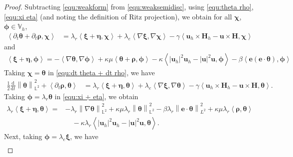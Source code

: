 \documentclass[11pt, reqno]{amsart}
\theoremstyle{definition}
\theoremstyle{remark}
\numberwithin{equation}{section}
\newcommand{\bff}{\boldsymbol}
\newcommand{\bb}{\mathbb}
\newcommand{\ddt}{\frac{\mathrm{d}}{\mathrm{d}t}}
\newcommand{\norm}[2]{\left\|{#1}\right\|_{#2}}
\newcommand{\inpro}[2]{\left\langle#1,#2\right\rangle}
\begin{document}
\begin{proof}
Subtracting \eqref{equ:weakform} from \eqref{equ:weaksemidisc}, using \eqref{equ:theta rho}, \eqref{equ:xi eta} (and noting the definition of Ritz projection), we obtain for all $\bff{\chi}$, $\bff{\phi}\in \bb{V}_h$,
\begin{align}\label{equ:dt theta + dt rho}
	\inpro{\partial_t \bff{\theta}+ \partial_t \bff{\rho}}{\bff{\chi}}
	&=
	\lambda_r \inpro{\bff{\xi}+\bff{\eta}}{\bff{\chi}}
	+
	\lambda_e \inpro{\nabla \bff{\xi}}{\nabla \bff{\chi}}
	-
	\gamma \inpro{\bff{u}_h \times \bff{H}_h - \bff{u} \times \bff{H}}{\bff{\chi}}
\end{align}
and
\begin{align}
	\label{equ:xi + eta}
	\inpro{\bff{\xi}+\bff{\eta}}{\bff{\phi}}
	=
	-\inpro{\nabla \bff{\theta}}{\nabla \bff{\phi}}
	+
	\kappa\mu \inpro{\bff{\theta}+\bff{\rho}}{\bff{\phi}}
	-
	\kappa \inpro{|\bff{u}_h|^2 \bff{u}_h - |\bff{u}|^2 \bff{u}}{\bff{\phi}}
	-
	\beta \inpro{\bff{e}(\bff{e}\cdot \bff{\theta})}{\bff{\phi}}
\end{align}
Taking $\bff{\chi}= \bff{\theta}$ in \eqref{equ:dt theta + dt rho}, we have
\begin{align}\label{equ:dt theta chi theta}
	\frac{1}{2} \ddt \norm{\bff{\theta}}{\bb{L}^2}^2
	+
	\inpro{\partial_t \bff{\rho}}{\bff{\theta}}
	&=
	\lambda_r \inpro{\bff{\xi}+\bff{\eta}}{\bff{\theta}}
	+
	\lambda_e \inpro{\nabla \bff{\xi}}{\nabla \bff{\theta}}
	-
	\gamma \inpro{\bff{u}_h \times \bff{H}_h - \bff{u} \times \bff{H}}{\bff{\theta}}.
\end{align}
Taking $\bff{\phi}= \lambda_r \bff{\theta}$ in \eqref{equ:xi + eta}, we obtain
\begin{align}\label{equ:xi+eta theta}
	\lambda_r \inpro{\bff{\xi}+\bff{\eta}}{\bff{\theta}}
	=
	&-\lambda_r \norm{\nabla \bff{\theta}}{\bb{L}^2}^2
	+
	\kappa\mu \lambda_r \norm{\bff{\theta}}{\bb{L}^2}^2
	-
	\beta \lambda_r \norm{\bff{e}\cdot\bff{\theta}}{L^2}^2
	+
	\kappa \mu\lambda_r \inpro{\bff{\rho}}{\bff{\theta}}
	\nonumber \\
	&\quad
	-
	\kappa \lambda_r \inpro{|\bff{u}_h|^2 \bff{u}_h - |\bff{u}|^2 \bff{u}}{\bff{\theta}}.
\end{align}
Next, taking $\bff{\phi}= \lambda_e \bff{\xi}$, we have
\begin{align}\label{equ:xi phi=xi}

\end{align}
\end{proof}
\end{document}
